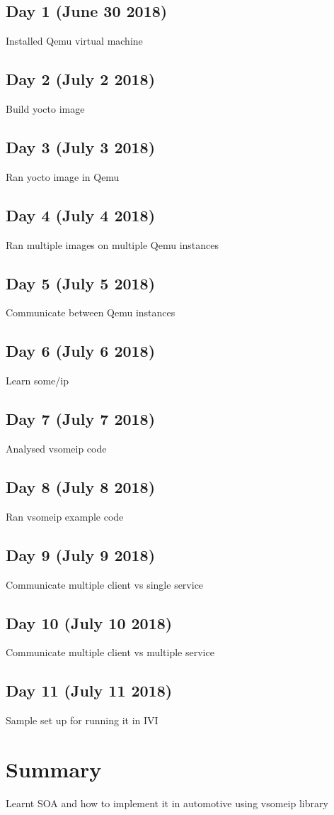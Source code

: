 \documentclass{fisattraining}
\begin{document}
\section{Day 1 (June 30 2018)}
Installed Qemu virtual machine
\section{Day 2 (July 2 2018)}
Build yocto image
\section{Day 3 (July 3 2018)}
Ran yocto image in Qemu
\section{Day 4 (July 4 2018)}
Ran multiple images on multiple Qemu instances
\section{Day 5 (July 5 2018)}
Communicate between Qemu instances
\section{Day 6 (July 6 2018)}
Learn some/ip
\section{Day 7 (July 7 2018)}
Analysed vsomeip code
\section{Day 8 (July 8 2018)}
Ran vsomeip example code
\section{Day 9 (July 9 2018)}
Communicate multiple client vs single service
\section{Day 10 (July 10 2018)}
Communicate multiple client vs multiple service
\section{Day 11 (July 11 2018)}
Sample set up for running it in IVI
\chapter{Summary}
Learnt SOA and how to implement it in automotive using vsomeip library
\end{document}
